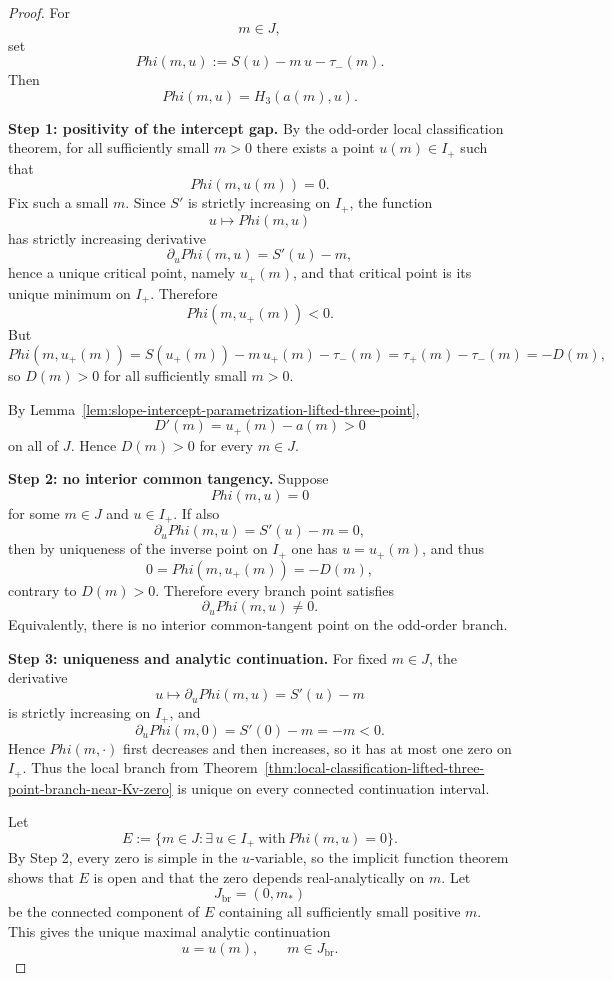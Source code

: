 \documentclass[11pt,a4paper]{amsart}
\def\Phi{Phi}%
\theoremstyle{plain}
\theoremstyle{definition}
\begin{document}
\begin{proof}
For
\[
m\in J,
\]
set
\[
\Phi(m,u):=S(u)-m\,u-\tau_-(m).
\]
Then
\[
\Phi(m,u)=H_3(a(m),u).
\]

\smallskip

\noindent
\textbf{Step 1: positivity of the intercept gap.}
By the odd-order local classification theorem, for all sufficiently small
$m>0$ there exists a point $u(m)\in I_+$ such that
\[
\Phi(m,u(m))=0.
\]
Fix such a small $m$. Since $S'$ is strictly increasing on $I_+$, the function
\[
u\longmapsto \Phi(m,u)
\]
has strictly increasing derivative
\[
\partial_u\Phi(m,u)=S'(u)-m,
\]
hence a unique critical point, namely $u_+(m)$, and that critical point is its
unique minimum on $I_+$. Therefore
\[
\Phi(m,u_+(m))<0.
\]
But
\[
\Phi(m,u_+(m))
=
S(u_+(m))-m\,u_+(m)-\tau_-(m)
=
\tau_+(m)-\tau_-(m)
=
-D(m),
\]
so $D(m)>0$ for all sufficiently small $m>0$.

By Lemma~\ref{lem:slope-intercept-parametrization-lifted-three-point},
\[
D'(m)=u_+(m)-a(m)>0
\]
on all of $J$. Hence $D(m)>0$ for every $m\in J$.

\smallskip

\noindent
\textbf{Step 2: no interior common tangency.}
Suppose
\[
\Phi(m,u)=0
\]
for some $m\in J$ and $u\in I_+$. If also
\[
\partial_u\Phi(m,u)=S'(u)-m=0,
\]
then by uniqueness of the inverse point on $I_+$ one has $u=u_+(m)$, and thus
\[
0=\Phi(m,u_+(m))=-D(m),
\]
contrary to $D(m)>0$. Therefore every branch point satisfies
\[
\partial_u\Phi(m,u)\neq 0.
\]
Equivalently, there is no interior common-tangent point on the odd-order
branch.

\smallskip

\noindent
\textbf{Step 3: uniqueness and analytic continuation.}
For fixed $m\in J$, the derivative
\[
u\longmapsto \partial_u\Phi(m,u)=S'(u)-m
\]
is strictly increasing on $I_+$, and
\[
\partial_u\Phi(m,0)=S'(0)-m=-m<0.
\]
Hence $\Phi(m,\cdot)$ first decreases and then increases, so it has at most one
zero on $I_+$. Thus the local branch from
Theorem~\ref{thm:local-classification-lifted-three-point-branch-near-Kv-zero}
is unique on every connected continuation interval.

Let
\[
E:=\{m\in J:\exists\,u\in I_+\ \text{with}\ \Phi(m,u)=0\}.
\]
By Step 2, every zero is simple in the $u$-variable, so the implicit function
theorem shows that $E$ is open and that the zero depends real-analytically on
$m$. Let
\[
J_{\mathrm{br}}=(0,m_*)
\]
be the connected component of $E$ containing all sufficiently small positive
$m$. This gives the unique maximal analytic continuation
\[
u=u(m),
\qquad
m\in J_{\mathrm{br}}.
\]


\end{proof}
\end{document}
